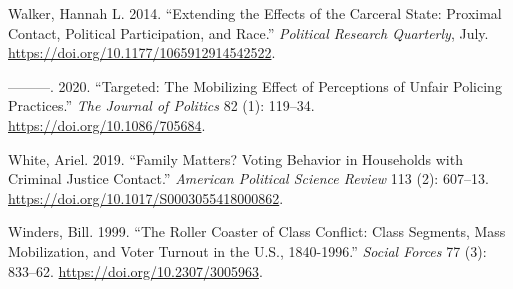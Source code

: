 \documentclass[
  12pt,
]{article}
\newlength{\cslhangindent}
\newenvironment{cslreferences}%
  {\setlength{\parindent}{0pt}%
  \everypar{\setlength{\hangindent}{\cslhangindent}}\ignorespaces}%
  {\par}
\begin{document}
\begin{cslreferences}
\leavevmode\hypertarget{ref-Walker2014}{}%
Walker, Hannah L. 2014. ``Extending the Effects of the Carceral State: Proximal Contact, Political Participation, and Race.'' \emph{Political Research Quarterly}, July. \url{https://doi.org/10.1177/1065912914542522}.

\leavevmode\hypertarget{ref-Walker2020}{}%
---------. 2020. ``Targeted: The Mobilizing Effect of Perceptions of Unfair Policing Practices.'' \emph{The Journal of Politics} 82 (1): 119--34. \url{https://doi.org/10.1086/705684}.

\leavevmode\hypertarget{ref-White2019}{}%
White, Ariel. 2019. ``Family Matters? Voting Behavior in Households with Criminal Justice Contact.'' \emph{American Political Science Review} 113 (2): 607--13. \url{https://doi.org/10.1017/S0003055418000862}.

\leavevmode\hypertarget{ref-Winders1999}{}%
Winders, Bill. 1999. ``The Roller Coaster of Class Conflict: Class Segments, Mass Mobilization, and Voter Turnout in the U.S., 1840-1996.'' \emph{Social Forces} 77 (3): 833--62. \url{https://doi.org/10.2307/3005963}.
\end{cslreferences}
\end{document}
